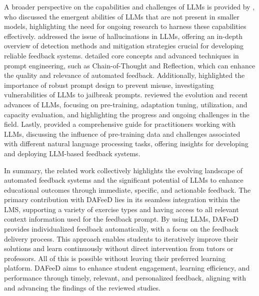 \documentclass[sigconf,screen,review,anonymous]{acmart}
\begin{document}
A broader perspective on the capabilities and challenges of LLMs is provided by \citet{wei:2022:EmergentAbilitiesLarge}, who discussed the emergent abilities of LLMs that are not present in smaller models, highlighting the need for ongoing research to harness these capabilities effectively.
\citet{huang:2023:SurveyHallucinationLargeb} addressed the issue of hallucinations in LLMs, offering an in-depth overview of detection methods and mitigation strategies crucial for developing reliable feedback systems.
\citet{amatriain:2024:PromptDesignEngineering} detailed core concepts and advanced techniques in prompt engineering, such as Chain-of-Thought and Reflection, which can enhance the quality and relevance of automated feedback.
Additionally, \citet{liu:2024:JailbreakingChatGPTPrompt} highlighted the importance of robust prompt design to prevent misuse, investigating vulnerabilities of LLMs to jailbreak prompts.
\citet{zhao:2023:SurveyLargeLanguage} reviewed the evolution and recent advances of LLMs, focusing on pre-training, adaptation tuning, utilization, and capacity evaluation, and highlighting the progress and ongoing challenges in the field.
Lastly, \citet{yang:2024:HarnessingPowerLLMs} provided a comprehensive guide for practitioners working with LLMs, discussing the influence of pre-training data and challenges associated with different natural language processing tasks, offering insights for developing and deploying LLM-based feedback systems.

In summary, the related work collectively highlights the evolving landscape of automated feedback systems and the significant potential of LLMs to enhance educational outcomes through immediate, specific, and actionable feedback.
The primary contribution with DAFeeD lies in its seamless integration within the LMS, supporting a variety of exercise types and having access to all relevant context information used for the feedback prompt.
By using LLMs, DAFeeD provides individualized feedback automatically, with a focus on the feedback delivery process.
This approach enables students to iteratively improve their solutions and learn continuously without direct intervention from tutors or professors.
All of this is possible without leaving their preferred learning platform.
DAFeeD aims to enhance student engagement, learning efficiency, and performance through timely, relevant, and personalized feedback, aligning with and advancing the findings of the reviewed studies.


\end{document}
